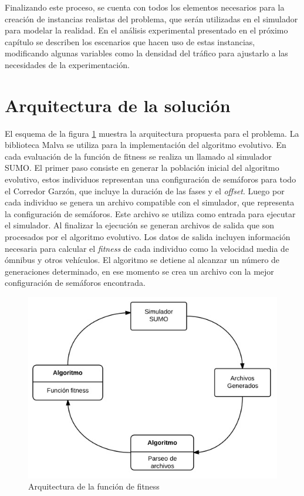 Finalizando este proceso, se cuenta con todos los elementos necesarios para la creación de instancias realistas del problema, que serán utilizadas en el simulador para modelar la realidad. En el análisis experimental presentado en el próximo capítulo se describen los escenarios que hacen uso de estas instancias, modificando algunas variables como la densidad del tráfico para ajustarlo a las necesidades de la experimentación.


\section{Arquitectura de la solución}

El esquema de la figura \ref{fig:arquitectura1}  muestra la arquitectura propuesta para el problema. La biblioteca Malva se utiliza para la implementación del algoritmo evolutivo. En cada evaluación de la función de fitness se realiza un llamado al simulador SUMO. El primer paso consiste en generar la población inicial del algoritmo evolutivo, estos individuos representan una configuración de semáforos para todo el Corredor Garzón, que incluye la duración de las fases y el \emph{offset}. Luego por cada individuo se genera un archivo compatible con el simulador, que representa la configuración de semáforos. Este archivo se utiliza como entrada para ejecutar el simulador. Al finalizar la ejecución se generan archivos de salida que son procesados por el algoritmo evolutivo. Los datos de salida incluyen información necesaria para calcular el \emph{fitness} de cada individuo como la velocidad media de ómnibus y otros vehículos. El algoritmo se detiene al alcanzar un número de generaciones determinado, en ese momento se crea un archivo con la mejor configuración de semáforos encontrada. 

\begin{figure}[H]
	\centering
	\includegraphics[width=0.7\linewidth]{Figures/arquitectura1}
	\caption{Arquitectura de la función de fitness}
	\label{fig:arquitectura1}
\end{figure}

